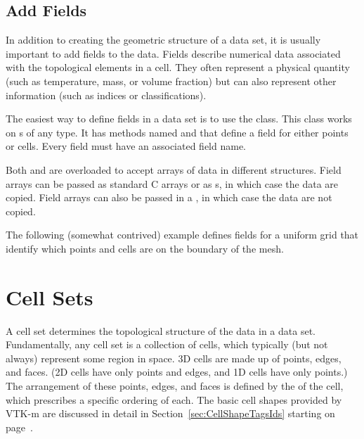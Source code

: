 \subsection{Add Fields}

In addition to creating the geometric structure of a data set, it is
usually important to add fields to the data. Fields describe numerical data
associated with the topological elements in a cell. They often represent a
physical quantity (such as temperature, mass, or volume fraction) but can
also represent other information (such as indices or classifications).

The easiest way to define fields in a data set is to use the
 class. This class works on
s of any type. It has methods named
 and  that define a field
for either points or cells. Every field must have an associated field name.

Both  and  are overloaded to
accept arrays of data in different structures. Field arrays can be passed
as standard C arrays or as s, in which case the data
are copied. Field arrays can also be passed in a
, in which case the data are not copied.

The following (somewhat contrived) example defines fields for a uniform
grid that identify which points and cells are on the boundary of the mesh.



\section{Cell Sets}
\label{sec:DataSets:CellSets}


A cell set determines the topological structure of the data in a data set.
Fundamentally, any cell set is a collection of cells, which typically (but
not always) represent some region in space. 3D cells are made up of points,
edges, and faces. (2D cells have only points and edges, and 1D cells have
only points.) The arrangement of these points, edges, and faces is defined
by the 
of the cell, which prescribes a specific ordering of each. The basic cell
shapes provided by VTK-m are discussed in detail in
Section~\ref{sec:CellShapeTagsIds} starting on
page~\pageref{sec:CellShapeTagsIds}.

